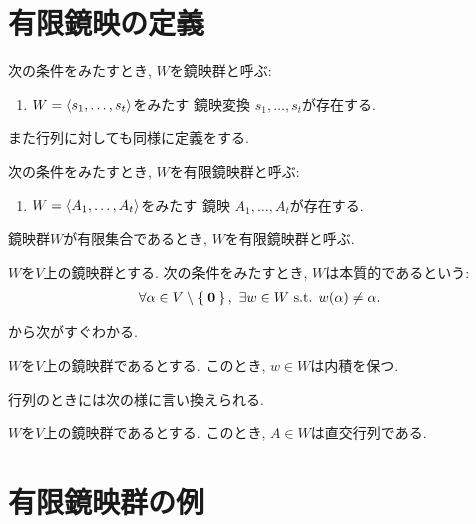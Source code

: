 \section{有限鏡映の定義}
\begin{definition}
  次の条件をみたすとき, 
  $W$を鏡映群と呼ぶ:
  \begin{enumerate}
  \item
    $W=\Braket{s_1,\ldots,s_t}$をみたす
    鏡映変換
    $s_1,\ldots,s_t$が存在する.
  \end{enumerate}
\end{definition}

また行列に対しても同様に定義をする.
\begin{definition}
  次の条件をみたすとき, 
  $W$を有限鏡映群と呼ぶ:
  \begin{enumerate}
  \item
    $W=\Braket{A_1,\ldots,A_t}$をみたす
    鏡映
    $A_1,\ldots,A_t$が存在する.
  \end{enumerate}
\end{definition}
鏡映群$W$が有限集合であるとき,
$W$を有限鏡映群と呼ぶ.

\begin{definition}
  $W$を$V$上の鏡映群とする.
  次の条件をみたすとき, 
  $W$は本質的であるという:
  \begin{align*}
    \forall \alpha\in V\setminus\Set{\zzero},\ 
    \exists w\in W
    \text{ s.t. }
    w(\alpha)\neq \alpha.
  \end{align*}
\end{definition}

から次がすぐわかる.
\begin{prop}
\label{prop:reflgrpisortho}
  $W$を$V$上の鏡映群であるとする.
  このとき, $w\in W$は内積を保つ.
\end{prop}

行列のときには次の様に言い換えられる.
\begin{prop}
  $W$を$V$上の鏡映群であるとする.
  このとき, $A \in W$は直交行列である.
\end{prop}

\section{有限鏡映群の例}
